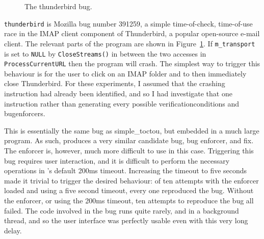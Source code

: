 \begin{figure}
  \caption{The thunderbird bug.}
  \label{fig:eval:thunderbird}
\end{figure}

\verb|thunderbird| is Mozilla bug number
391259\cite{thunderbird39125}, a simple time-of-check, time-of-use
race in the IMAP client component of Thunderbird, a popular
open-source e-mail client.  The relevant parts of the program are
shown in Figure~\ref{fig:eval:thunderbird}.  If \verb|m_transport| is
set to \verb|NULL| by \verb|CloseStreams()| in between the two
accesses in \verb|ProcessCurrentURL| then the program will crash.  The
simplest way to trigger this behaviour is for the user to click on an
IMAP folder and to then immediately close Thunderbird.  For these
experiments, I assumed that the crashing instruction had already been
identified, and so I had {\implementation} investigate that one
instruction rather than generating every possible
\glspl{verificationcondition} and \glspl{bugenforcer}.

This is essentially the same bug as simple\_toctou, but embedded in a
much large program.  As such, {\implementation} produces a very
similar candidate bug, bug enforcer, and fix.  The enforcer is,
however, much more difficult to use in this case.  Triggering this bug
requires user interaction, and it is difficult to perform the
necessary operations in {\implementation}'s default 200ms timeout.
Increasing the timeout to five seconds made it trivial to trigger the
desired behaviour: of ten attempts with the enforcer loaded and using
a five second timeout, every one reproduced the bug.  Without the
enforcer, or using the 200ms timeout, ten attempts to reproduce the
bug all failed.  The code involved in the bug runs quite rarely, and
in a background thread, and so the user interface was perfectly usable
even with this very long delay.

